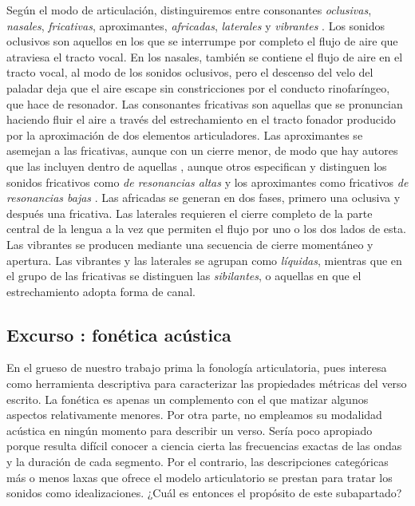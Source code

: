 Según el modo de articulación, distinguiremos entre consonantes \textit{oclusivas}, \textit{nasales}, \textit{fricativas}, aproximantes, \textit{africadas}, \textit{laterales} y \textit{vibrantes} \parencite[33-35]{canellada1987}. Los sonidos oclusivos son aquellos en los que se interrumpe por completo el flujo de aire que atraviesa el tracto vocal. En los nasales, también se contiene el flujo de aire en el tracto vocal, al modo de los sonidos oclusivos, pero el descenso del velo del paladar deja que el aire escape sin constricciones por el conducto rinofaríngeo, que hace de resonador. Las consonantes fricativas son aquellas que se pronuncian haciendo fluir el aire a través del estrechamiento en el tracto fonador producido por la aproximación de dos elementos articuladores. Las aproximantes se asemejan a las fricativas, aunque con un cierre menor, de modo que hay autores que las incluyen dentro de aquellas \parencites[161]{alarcos1964}[76]{navarrotomas2004}, aunque otros especifican y distinguen los sonidos fricativos como \textit{de resonancias altas} y los aproximantes como fricativos \textit{de resonancias bajas}  \parencite[258]{quilis2019}. Las africadas se generan en dos fases, primero una oclusiva y después una fricativa. Las laterales requieren el cierre completo de la parte central de la lengua a la vez que permiten el flujo por uno o los dos lados de esta. Las vibrantes se producen mediante una secuencia de cierre momentáneo y apertura. Las vibrantes y las laterales se agrupan como \textit{líquidas}, mientras que en el grupo de las fricativas se distinguen las \textit{sibilantes}, o aquellas en que el estrechamiento adopta forma de canal.

\subsection{Excurso : fonética acústica}
En el grueso de nuestro trabajo prima la fonología articulatoria, pues interesa como herramienta descriptiva para caracterizar las propiedades métricas del verso escrito. La fonética es apenas un complemento con el que matizar algunos aspectos relativamente menores. Por otra parte, no empleamos su modalidad acústica en ningún momento para describir un verso. Sería poco apropiado porque resulta difícil conocer a ciencia cierta las frecuencias exactas de las ondas y la duración de cada segmento. Por el contrario, las descripciones categóricas más o menos laxas que ofrece el modelo articulatorio se prestan para tratar los sonidos como idealizaciones. ¿Cuál es entonces el propósito de este subapartado? \

